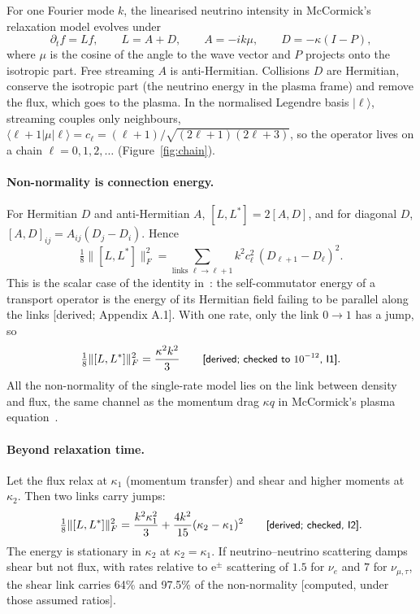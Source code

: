 \documentclass[11pt]{article}
\newcommand{\grade}[1]{\textsf{\small[#1]}}
\begin{document}
For one Fourier mode $k$, the linearised neutrino intensity in McCormick's relaxation model evolves under
\begin{equation}
\partial_t f=L f,\qquad L=A+D,\qquad A=-ik\mu,\qquad D=-\kappa(I-P),
\end{equation}
where $\mu$ is the cosine of the angle to the wave vector and $P$ projects onto the isotropic part. Free streaming $A$ is anti-Hermitian. Collisions $D$ are Hermitian, conserve the isotropic part (the neutrino energy in the plasma frame) and remove the flux, which goes to the plasma. In the normalised Legendre basis $|\ell\rangle$, streaming couples only neighbours, $\langle\ell+1|\mu|\ell\rangle=c_\ell=(\ell+1)/\sqrt{(2\ell+1)(2\ell+3)}$, so the operator lives on a chain $\ell=0,1,2,\dots$ (Figure~\ref{fig:chain}).

\paragraph{Non-normality is connection energy.} For Hermitian $D$ and anti-Hermitian $A$, $[L,L^\ast]=2[A,D]$, and for diagonal $D$, $[A,D]_{ij}=A_{ij}(D_j-D_i)$. Hence
\begin{equation}
\tfrac18\lVert[L,L^\ast]\rVert_F^2=\sum_{\text{links }\ell\to\ell+1}k^2c_\ell^2\,(D_{\ell+1}-D_\ell)^2 .
\end{equation}
This is the scalar case of the identity in~\cite{CE}: the self-commutator energy of a transport operator is the energy of its Hermitian field failing to be parallel along the links \grade{derived; Appendix A.1}. With one rate, only the link $0\to1$ has a jump, so
\begin{equation}
\tfrac18\lVert[L,L^\ast]\rVert_F^2=\frac{\kappa^2k^2}{3}\qquad\text{\grade{derived; checked to $10^{-12}$, I1}}.
\end{equation}
All the non-normality of the single-rate model lies on the link between density and flux, the same channel as the momentum drag $\kappa q$ in McCormick's plasma equation~\cite[Eq.~(6)]{McC}.

\paragraph{Beyond relaxation time.} Let the flux relax at $\kappa_1$ (momentum transfer) and shear and higher moments at $\kappa_2$. Then two links carry jumps:
\begin{equation}
\tfrac18\lVert[L,L^\ast]\rVert_F^2=\frac{k^2\kappa_1^2}{3}+\frac{4k^2}{15}(\kappa_2-\kappa_1)^2\qquad\text{\grade{derived; checked, I2}}.
\end{equation}
The energy is stationary in $\kappa_2$ at $\kappa_2=\kappa_1$. If neutrino--neutrino scattering damps shear but not flux, with rates relative to e$^\pm$ scattering of $1.5$ for $\nu_e$ and $7$ for $\nu_{\mu,\tau}$, the shear link carries 64\% and 97.5\% of the non-normality \grade{computed, under those assumed ratios}.
\end{document}

